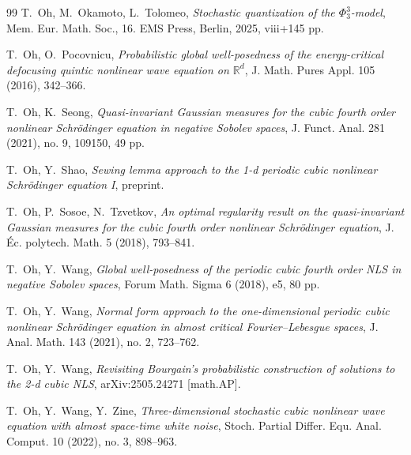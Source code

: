 \documentclass[letterpaper, 11pt,  reqno]{amsart}
\newcommand{\1}{\hspace{0.5mm}\text{I}\hspace{0.5mm}}
\newcommand{\R}{\mathbb{R}}
\numberwithin{equation}{section}
\numberwithin{theorem}{section}
\begin{document}
\begin{thebibliography}{99}
T.~Oh, M.~Okamoto, L.~Tolomeo,
{\it Stochastic quantization of the $\Phi^3_3$-model}, 
Mem. Eur. Math. Soc., 16. EMS Press, Berlin, 2025, viii+145 pp. 





T.~Oh, O.~Pocovnicu,
{\it  Probabilistic global well-posedness of the energy-critical defocusing quintic nonlinear wave equation on $\R^d$}, J. Math. Pures Appl. 105 (2016), 342--366. 



T.~Oh, K.~Seong,
{\it  Quasi-invariant Gaussian measures for the cubic fourth order nonlinear Schr\"odinger equation in negative Sobolev spaces}, J. Funct. Anal. 281 (2021), no. 9, 109150, 49 pp. 




T.~Oh, Y.~Shao,
{\it  Sewing lemma approach to the 1-d periodic cubic nonlinear Schr\"odinger equation I},
preprint.



T.~Oh, P.~Sosoe, N.~Tzvetkov,
{\it  An optimal regularity result on the quasi-invariant Gaussian measures for the cubic fourth order nonlinear Schr\"odinger equation},  
J. \'Ec. polytech. Math. 5 (2018), 793--841. 





T.~Oh, Y.~Wang,
{\it Global well-posedness of the periodic cubic fourth order NLS in negative Sobolev spaces},
 Forum Math. Sigma 6 (2018), e5, 80 pp. 





T.~Oh, Y.~Wang,
{\it  Normal form approach to the one-dimensional periodic cubic nonlinear Schr\"odinger equation in almost critical Fourier--Lebesgue spaces}, 
J. Anal. Math. 143 (2021), no. 2, 723--762. 

T.~Oh, Y.~Wang,
{\it Revisiting Bourgain's probabilistic construction of solutions to the 2-d cubic NLS}, 
arXiv:2505.24271 [math.AP].


T.~Oh, Y.~Wang, Y.~Zine,
\textit{Three-dimensional stochastic cubic nonlinear wave equation with almost space-time white noise},
Stoch. Partial Differ. Equ. Anal. Comput. 10 (2022), no. 3, 898--963.



\end{thebibliography}
\end{document}

